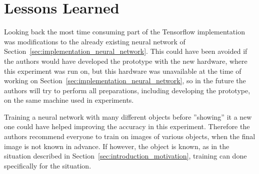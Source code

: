 \section{Lessons Learned}
Looking back the most time consuming part of the Tensorflow implementation was modifications to the already existing neural network of Section~\ref{sec:implementation_neural_network}. This could have been avoided if the authors would have developed the prototype with the new hardware, where this experiment was run on, but this hardware was unavailable at the time of working on Section~\ref{sec:implementation_neural_network}, so in the future the authors will try to perform all preparations, including developing the prototype, on the same machine used in experiments.

Training a neural network with many different objects before ''showing'' it a new one could have helped improving the accuracy in this experiment. Therefore the authors recommend everyone to train on images of various objects, when the final image is not known in advance. If however, the object is known, as in the situation described in Section~\ref{sec:introduction_motivation}, training can done specifically for the situation.

\filbreak
